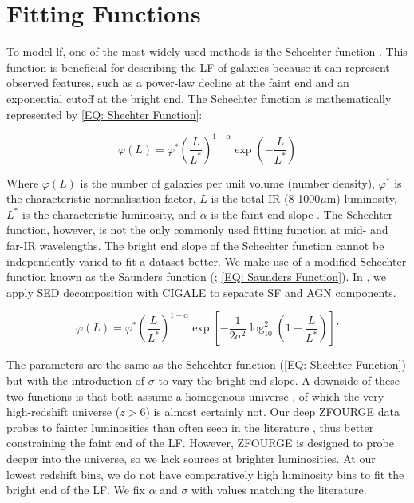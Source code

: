 \section{Fitting Functions} \label{Sec: Fitting functions}
To model \gls{lf}, one of the most widely used methods is the Schechter function \citep{schechter_analytic_1976}. This function is beneficial for describing the LF of galaxies because it can represent observed features, such as a power-law decline at the faint end and an exponential cutoff at the bright end. The Schechter function is mathematically represented by \cref{EQ: Shechter Function}:

\begin{equation} 
    \varphi(L) = \varphi^* \left(\frac{L}{L^*}\right)^{1-\alpha} \exp\left(-\frac{L}{L^*}\right) 
    \label{EQ: Shechter Function}
\end{equation}

Where $\varphi(L)$ is the number of galaxies per unit volume (number density), $\varphi^*$ is the characteristic normalisation factor, $L$ is the total IR (8-1000$\mu$m) luminosity, $L^*$ is the characteristic luminosity, and $\alpha$ is the faint end slope \citep{schechter_analytic_1976}. The Schechter function, however, is not the only commonly used fitting function at mid- and far-IR wavelengths. The bright end slope of the Schechter function cannot be independently varied to fit a dataset better. We make use of a modified Schechter function known as the Saunders function (\citealp{saunders_60-mum_1990}; \cref{EQ: Saunders Function}). In , we apply SED decomposition with CIGALE to separate SF and AGN components.

\begin{equation} 
    \varphi(L) = \varphi^* \left(\frac{L}{L^*}\right)^{1-\alpha} \exp\left[-\frac{1}{2\sigma^2}\log_{10}^2\left(1+\frac{L}{L^*}\right)\right]
    \label{EQ: Saunders Function}'
\end{equation}

The parameters are the same as the Schechter function (\cref{EQ: Shechter Function}) but with the introduction of $\sigma$ to vary the bright end slope. A downside of these two functions is that both assume a homogenous universe \citep{goto_luminosity_2011}, of which the very high-redshift universe ($z>6$) is almost certainly not. Our deep ZFOURGE data probes to fainter luminosities than often seen in the literature \citep{gruppioni_herschel_2013, rodighiero_mid-_2010}, thus better constraining the faint end of the LF. However, ZFOURGE is designed to probe deeper into the universe, so we lack sources at brighter luminosities. At our lowest redshift bins, we do not have comparatively high luminosity bins to fit the bright end of the LF. We fix $\alpha$ and $\sigma$ with values matching the literature. 

